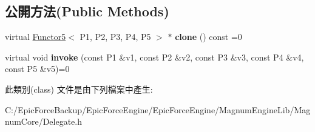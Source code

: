 \subsection*{公開方法(Public Methods)}
\begin{DoxyCompactItemize}
\item 
virtual \hyperlink{class_magnum_1_1_functor5}{Functor5}$<$ P1, P2, P3, P4, P5 $>$ $\ast$ {\bfseries clone} () const  =0\hypertarget{class_magnum_1_1_functor5_ac7930d89ced5d9d0f14141b37f0fe959}{}\label{class_magnum_1_1_functor5_ac7930d89ced5d9d0f14141b37f0fe959}

\item 
virtual void {\bfseries invoke} (const P1 \&v1, const P2 \&v2, const P3 \&v3, const P4 \&v4, const P5 \&v5)=0\hypertarget{class_magnum_1_1_functor5_a4ec08cfa4ea23ddec5d9c617d878462f}{}\label{class_magnum_1_1_functor5_a4ec08cfa4ea23ddec5d9c617d878462f}

\end{DoxyCompactItemize}


此類別(class) 文件是由下列檔案中產生\+:\begin{DoxyCompactItemize}
\item 
C\+:/\+Epic\+Force\+Backup/\+Epic\+Force\+Engine/\+Epic\+Force\+Engine/\+Magnum\+Engine\+Lib/\+Magnum\+Core/Delegate.\+h\end{DoxyCompactItemize}
